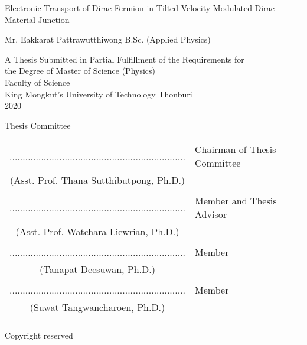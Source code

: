 \begin{center}
    Electronic Transport of Dirac Fermion in Tilted Velocity Modulated Dirac Material Junction
    \\

    \vspace{1.5cm}

    Mr. Eakkarat    Pattrawutthiwong  B.Sc. (Applied Physics) \\

    \vspace{1.5cm}

    A Thesis Submitted in Partial Fulfillment of the Requirements for\\
    the Degree of Master of Science  (Physics) \\
    Faculty of Science \\
    King Mongkut's University of Technology Thonburi \\
    2020 \\
\end{center}

    \vspace{.3cm}\noindent Thesis Committee \vspace{1cm}

\noindent \begin{tabular}{cl}

    ...................................................................&   \hspace{0.3in} Chairman of Thesis Committee \\
    \noindent(Asst. Prof. Thana Sutthibutpong, Ph.D.)  & \\ \\

    ...................................................................&   \hspace{0.3in} Member and Thesis Advisor\\
    (Asst. Prof. Watchara Liewrian, Ph.D.)  & \\ \\

    ...................................................................&   \hspace{0.3in} Member\\
    (Tanapat Deesuwan, Ph.D.)  & \\ \\

    ...................................................................&   \hspace{0.3in} Member \\
    (Suwat Tangwancharoen, Ph.D.)  & \\ \\

\end{tabular}

\begin{center}
    Copyright reserved
\end{center}
